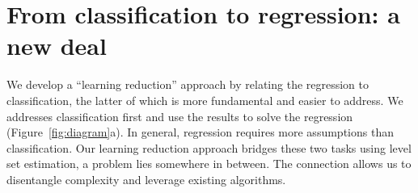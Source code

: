 \documentclass[11pt]{article}
\theoremstyle{definition}
\begin{document}
\vspace{-.3cm}
\section{From classification to regression: a new deal}\label{sec:idea}
\vspace{-.5cm}
We develop a ``learning reduction'' approach by relating the regression to classification, the latter of which is more fundamental and easier to address. We addresses classification first and use the results to solve the regression (Figure~\ref{fig:diagram}a). In general, regression requires more assumptions than classification. Our learning reduction approach bridges these two tasks using level set estimation, a problem lies somewhere in between. The connection allows us to disentangle complexity and leverage existing algorithms. 
\end{document}
